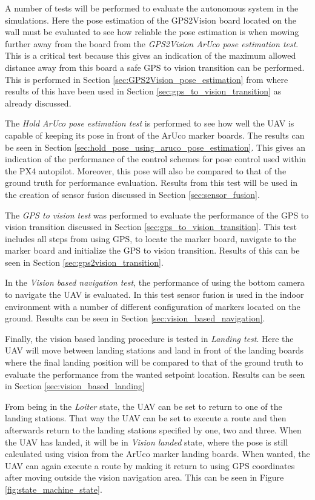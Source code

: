 \documentclass[../Head/report.tex]{subfiles}
\begin{document}
A number of tests will be performed to evaluate the autonomous system in the simulations. Here the pose estimation of the GPS2Vision board located on the wall must be evaluated to see how reliable the pose estimation is when mowing further away from the board from the \textit{GPS2Vision ArUco pose estimation test}. This is a critical test because this gives an indication of the maximum allowed distance away from this board a safe GPS to vision transition can be performed. This is performed in Section \ref{sec:GPS2Vision_pose_estimation} from where results of this have been used in Section \ref{sec:gps_to_vision_transition} as already discussed. 

The \textit{Hold ArUco pose estimation test} is performed to see how well the UAV is capable of keeping its pose in front of the ArUco marker boards. The results can be seen in Section \ref{sec:hold_pose_using_aruco_pose_estimation}. This gives an indication of the performance of the control schemes for pose control used within the PX4 autopilot. Moreover, this pose will also be compared to that of the ground truth for performance evaluation. Results from this test will be used in the creation of sensor fusion discussed in Section \ref{sec:sensor_fusion}.

The \textit{GPS to vision test} was performed to evaluate the performance of the GPS to vision transition discussed in Section \ref{sec:gps_to_vision_transition}. This test includes all steps from using GPS, to locate the marker board, navigate to the marker board and initialize the GPS to vision transition. Results of this can be seen in Section \ref{sec:gps2vision_transition}.

In the \textit{Vision based navigation test}, the performance of using the bottom camera to navigate the UAV is evaluated. In this test sensor fusion is used in the indoor environment with a number of different configuration of markers located on the ground. Results can be seen in Section \ref{sec:vision_based_navigation}. 

Finally, the vision based landing procedure is tested in \textit{Landing test}. Here the UAV will move between landing stations and land in front of the landing boards where the final landing position will be compared to that of the ground truth to evaluate the performance from the wanted setpoint location. Results can be seen in Section \ref{sec:vision_based_landing}

From being in the \textit{Loiter} state, the UAV can be set to return to one of the landing stations. That way the UAV can be set to execute a route and then afterwards return to the landing stations specified by one, two and three. When the UAV has landed, it will be in \textit{Vision landed} state, where the pose is still calculated using vision from the ArUco marker landing boards. When wanted, the UAV can again execute a route by making it return to using GPS coordinates after moving outside the vision navigation area. This can be seen in Figure \ref{fig:state_machine_state}. 
\end{document}
